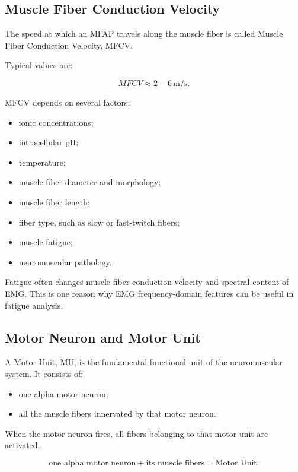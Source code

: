 \subsection{Muscle Fiber Conduction Velocity}

The speed at which an MFAP travels along the muscle fiber is called Muscle Fiber Conduction Velocity, MFCV.

Typical values are:

\[
MFCV \approx 2-6\,\text{m/s}.
\]

MFCV depends on several factors:

\begin{itemize}[noitemsep]
    \item ionic concentrations;
    \item intracellular pH;
    \item temperature;
    \item muscle fiber diameter and morphology;
    \item muscle fiber length;
    \item fiber type, such as slow or fast-twitch fibers;
    \item muscle fatigue;
    \item neuromuscular pathology.
\end{itemize}

\begin{authornote}
Fatigue often changes muscle fiber conduction velocity and spectral content of EMG. This is one reason why EMG frequency-domain features can be useful in fatigue analysis.
\end{authornote}

\subsection{Motor Neuron and Motor Unit}

A Motor Unit, MU, is the fundamental functional unit of the neuromuscular system. It consists of:

\begin{itemize}[noitemsep]
    \item one alpha motor neuron;
    \item all the muscle fibers innervated by that motor neuron.
\end{itemize}

When the motor neuron fires, all fibers belonging to that motor unit are activated.

\[
\text{one alpha motor neuron}
+
\text{its muscle fibers}
=
\text{Motor Unit}.
\]

